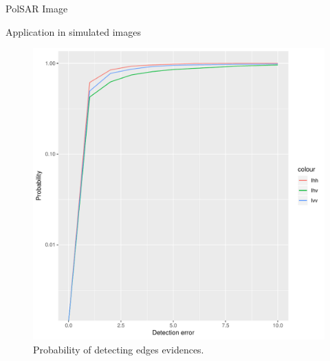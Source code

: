 \documentclass[10pt]{beamer}
\begin{document}
\begin{frame}[fragile]{PolSAR Image}
\begin{alertblock}{Application in simulated images} 
	\begin{figure}[hbt]
	\centering
	\includegraphics[width=.5\linewidth]{metricas_ihh_ivh_ivv_nhfc_artigos}%
	\caption{Probability of detecting edges evidences.}
\label{probability_edge_detc}
\end{figure}
\end{alertblock}
\end{frame}
\end{document}
